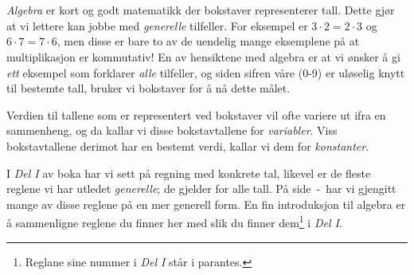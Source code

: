 


\section{\algintro}
\textit{Algebra} er kort og godt matematikk der bokstaver representerer tall. Dette gjør at vi lettere kan jobbe med \textsl{generelle} tilfeller. For eksempel er $ {3\cdot 2=2\cdot3} $ og $ 6\cdot7=7\cdot6 $, men disse er bare to av de uendelig mange eksemplene på at multiplikasjon er kommutativ! En av hensiktene med algebra er at vi ønsker å gi \textsl{ett} eksempel som forklarer \textsl{alle} tilfeller, og siden sifren våre (0-9) er uløselig knytt til bestemte tall, bruker vi bokstaver for å nå dette målet. \vsk

Verdien til tallene som er representert ved bokstaver vil ofte variere ut ifra en sammenheng, og da kallar vi disse bokstavtallene for \textit{variabler}. Viss bokstavtallene derimot har en bestemt verdi, kallar vi dem for \textit{konstanter}.

\vsk

I \textsl{Del I} av boka har vi sett på regning med konkrete tal, likevel er de fleste reglene vi har utledet \textsl{generelle}; de gjelder for alle tall. På side \pageref{regstart}\,-\,\pageref{regslutt} har vi gjengitt mange av disse reglene på en mer generell form. En fin introduksjon til algebra er å sammenligne reglene du finner her med slik du finner dem\footnote{Reglane sine nummer i \textsl{Del I} står i parantes.} i \textsl{Del I}. \vsk

\regv
\label{regstart}
\reg[\adkom\;(\ref{adkom}) \label{adkomalg}]{\vs
\[ a+ b =b+a \]
}
\eks{ \vsb
\[ 7+ 5=5+7 \]
} \vsk \vsk

\reg[\gangkom\;(\ref{gangkom})]{\vs
	\[ a\cdot b =b\cdot a \]
}
\eks[1]{ \vsb
	\[ 9\cdot 8=8\cdot9 \]
}
\eks[2]{ \vsb
\[  8\cdot a= a\cdot 8  \]
}
\newpage
{}
\vsk 

\reg[\brdef\;(\ref{brdef})]{
\[ a:b=\frac{a}{b} \]
}
\eks[]{ \vs
\[a:2= \frac{a}{2} \]
}
 \vsk 

